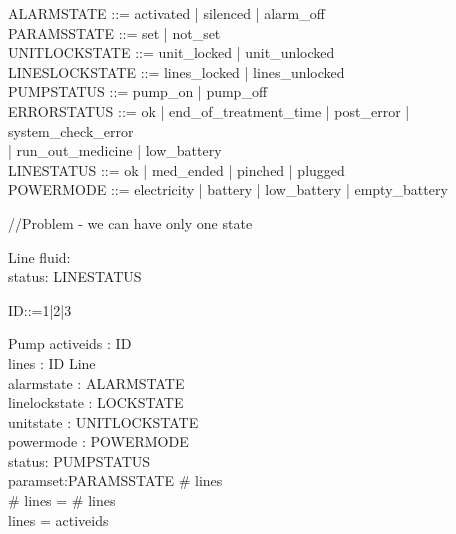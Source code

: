 \documentclass{article}
\begin{document}
	
	\begin{zed}
		
		ALARMSTATE ::= activated | silenced | alarm_off \\
		
		PARAMSSTATE ::= set | not\_set \\
		
		UNITLOCKSTATE ::= unit\_locked | unit\_unlocked \\
		
		LINESLOCKSTATE ::= lines\_locked | lines\_unlocked \\
		
		PUMPSTATUS ::= pump\_on | pump\_off \\
		
		
		ERRORSTATUS ::= ok | end\_of\_treatment\_time | post\_error | system\_check\_error \\ | run\_out\_medicine | low\_battery \\
		
		
		
		LINESTATUS ::= ok | med\_ended | pinched | plugged \\
		
		POWERMODE ::= electricity | battery | low\_battery | empty\_battery \\
	\end{zed}
	
	//Problem - we can have only one state
	
	\begin{schema}{Line}
		fluid: \nat \\
		status: LINESTATUS	
	\end{schema}
	
	\begin{zed}
		ID::=1|2|3
	\end{zed}
		
	\begin{schema}{Pump}
		activeids : \power ID\\
		lines : ID \pfun Line \\
		alarmstate : ALARMSTATE \\
		linelockstate : LOCKSTATE \\
		unitstate : UNITLOCKSTATE \\
		powermode : POWERMODE \\
		status: PUMPSTATUS\\
		paramset:PARAMSSTATE
	\where
		\# \ran lines \\
		\# \ran lines = \# \dom lines\\
		\dom lines = activeids\\
	\end{schema}
	
\end{document}
